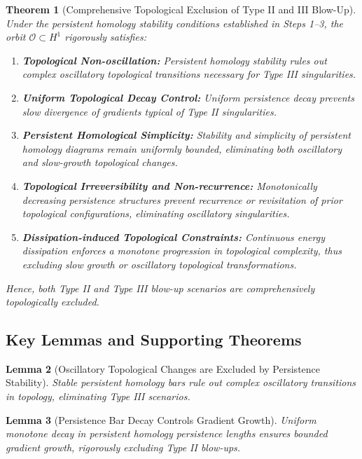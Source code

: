 \documentclass[11pt]{article}
\newtheorem{theorem}{Theorem}[section]
\newtheorem{lemma}[theorem]{Lemma}
\theoremstyle{definition}
\begin{document}
\begin{theorem}[Comprehensive Topological Exclusion of Type II and III Blow-Up]
\label{thm:comprehensive_exclusion}
Under the persistent homology stability conditions established in Steps 1--3, the orbit $\mathcal{O} \subset H^1$ rigorously satisfies:
\begin{enumerate}
  \item \textbf{Topological Non-oscillation:} Persistent homology stability rules out complex oscillatory topological transitions necessary for Type III singularities.
  \item \textbf{Uniform Topological Decay Control:} Uniform persistence decay prevents slow divergence of gradients typical of Type II singularities.
  \item \textbf{Persistent Homological Simplicity:} Stability and simplicity of persistent homology diagrams remain uniformly bounded, eliminating both oscillatory and slow-growth topological changes.
  \item \textbf{Topological Irreversibility and Non-recurrence:} Monotonically decreasing persistence structures prevent recurrence or revisitation of prior topological configurations, eliminating oscillatory singularities.
  \item \textbf{Dissipation-induced Topological Constraints:} Continuous energy dissipation enforces a monotone progression in topological complexity, thus excluding slow growth or oscillatory topological transformations.
\end{enumerate}
Hence, both Type II and Type III blow-up scenarios are comprehensively topologically excluded.
\end{theorem}

\subsection*{Key Lemmas and Supporting Theorems}

\begin{lemma}[Oscillatory Topological Changes are Excluded by Persistence Stability]
Stable persistent homology bars rule out complex oscillatory transitions in topology, eliminating Type III scenarios.
\end{lemma}

\begin{lemma}[Persistence Bar Decay Controls Gradient Growth]
Uniform monotone decay in persistent homology persistence lengths ensures bounded gradient growth, rigorously excluding Type II blow-ups.
\end{lemma}
\end{document}

